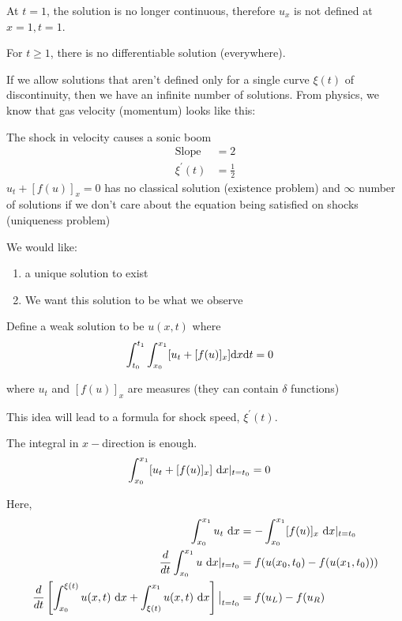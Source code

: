   At $t = 1$, the solution is no longer continuous, therefore $u_x$ is not defined at $x = 1, t = 1$.

  For $t \geq 1$, there is no differentiable solution (everywhere).


  If we allow solutions that aren't defined only for a single curve $\xi(t)$ of discontinuity, then we have an infinite number of solutions. From physics, we know that gas velocity (momentum) looks like this:


  The shock in velocity causes a sonic boom
  \begin{align}
    \text{Slope } & = 2\\
    \xi^\prime(t) & = \frac{1}{2}
  \end{align}
  $u_t + [f(u)]_x = 0$ has no classical solution (existence problem) and $\infty$ number of solutions if we don't care about the equation being satisfied on shocks (uniqueness problem)

  We would like:
  \begin{enumerate}
    \item a unique solution to exist
    \item We want this solution to be what we observe
  \end{enumerate}

  Define a weak solution to be $u(x, t)$ where
  \begin{align}
    \int^{t_1}_{t_0} \int^{x_1}_{x_0} [u_t + [f(u)]_x] \text dx \text dt & = 0
  \end{align}

  where $u_t$ and $[f(u)]_x$ are measures (they can contain $\delta$ functions)

  This idea will lead to a formula for shock speed, $\xi^\prime(t)$.

  The integral in $x-$direction is enough.
  \begin{align}
    \int^{x_1}_{x_0} [u_t + [f(u)]_x]\ \text dx|_{t = t_0} & = 0
  \end{align}

  Here,
  \begin{align}
    \int^{x_1}_{x_0} u_t\ \text dx
    & = - \int^{x_1}_{x_0} [f(u)]_x\ \text dx |_{t = t_0}\\
    \frac{d}{dt} \int^{x_1}_{x_0} u\ \text dx |_{t = t_0}
    & = f(u(x_0, t_0) - f(u(x_1, t_0)))\\
    \frac{d}{dt} \left[ \int^{\xi(t)}_{x_0} u(x, t)\ \text dx + \int^{x_1}_{\xi(t)} u(x, t)\ \text dx \right] \big|_{t = t_0}
    & = f(u_L) - f(u_R)
  \end{align}

